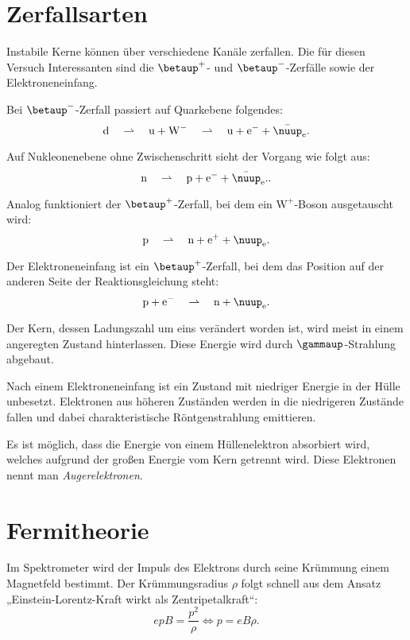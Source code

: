 \section{Zerfallsarten}

\newcommand\betaplus{\betaup^+}
\newcommand\betaminus{\betaup^-}

Instabile Kerne können über verschiedene Kanäle zerfallen. Die für diesen
Versuch Interessanten sind die $\betaplus$- und $\betaminus$-Zerfälle sowie der
Elektroneneinfang.

Bei $\betaminus$-Zerfall passiert auf Quarkebene folgendes:
\[
    \mathrm d
    \quad\rightharpoonup\quad
    \mathrm u + \mathrm W^-
    \quad\rightharpoonup\quad
    \mathrm u + \mathrm e^- + \bar\nuup_{\mathrm e}.
\]

Auf Nukleonenebene ohne Zwischenschritt sieht der Vorgang wie folgt aus:
\[
    \mathrm n
    \quad\rightharpoonup\quad
    \mathrm p + \mathrm e^- + \bar\nuup_{\mathrm e}..
\]

Analog funktioniert der $\betaplus$-Zerfall, bei dem ein $\mathrm W^+$-Boson
ausgetauscht wird:
\[
    \mathrm p
    \quad\rightharpoonup\quad
    \mathrm n + \mathrm e^+ + \nuup_{\mathrm e}.
\]

Der Elektroneneinfang ist ein $\betaplus$-Zerfall, bei dem das Position auf der
anderen Seite der Reaktionsgleichung steht:
\[
    \mathrm p + \mathrm e^-
    \quad\rightharpoonup\quad
    \mathrm n + \nuup_{\mathrm e}.
\]

Der Kern, dessen Ladungszahl um eins verändert worden ist, wird meist in einem
angeregten Zustand hinterlassen. Diese Energie wird durch $\gammaup$-Strahlung
abgebaut.

Nach einem Elektroneneinfang ist ein Zustand mit niedriger Energie in der Hülle
unbesetzt. Elektronen aus höheren Zuständen werden in die niedrigeren Zustände
fallen und dabei charakteristische Röntgenstrahlung emittieren.

Es ist möglich, dass die Energie von einem Hüllenelektron absorbiert
wird, welches aufgrund der großen Energie vom Kern getrennt wird. Diese
Elektronen nennt man \emph{Augerelektronen}.

\section{Fermitheorie}

Im Spektrometer wird der Impuls des Elektrons durch seine Krümmung einem
Magnetfeld bestimmt. Der Krümmungsradius $\rho$ folgt schnell aus dem Ansatz
„Einstein-Lorentz-Kraft wirkt als Zentripetalkraft“:
\[
    epB = \frac{p^2}{\rho}
    \iff
    p = eB\rho.
\]

